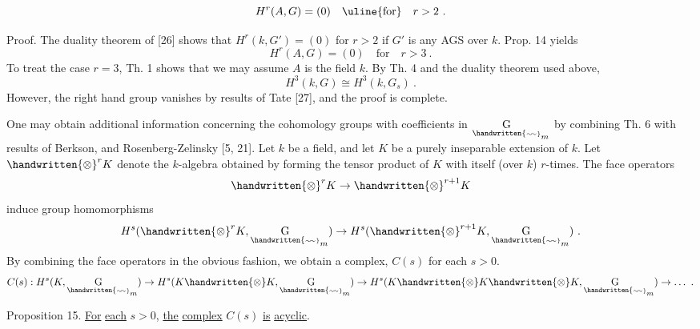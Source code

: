\[
H^r(A,G)=(0)\quad\text{\uline{for}}\quad r>2\ .
\]

Proof. The duality theorem of [26] shows that $H^r(k,G')=(0)$ for $r>2$ if $G'$ is any AGS over $k$. Prop. 14 yields
\[
H^r(A,G)=(0)\quad\text{for}\quad r>3\ .
\]
To treat the case $r=3$, Th. 1 shows that we may assume $A$ is the field $k$. By Th. 4 and the duality theorem used above,
\[
H^3(k,G)\cong H^3(k,G_s)\ .
\]
However, the right hand group vanishes by results of Tate [27], and the proof is complete.

One may obtain additional information concerning the cohomology groups with coefficients in $\underset{\handwritten{\scriptscriptstyle\sim\!\sim}}{\mathrm{G}}_m$ by combining Th. 6 with results of Berkson, and Rosenberg-Zelinsky [5, 21]. Let $k$ be a field, and let $K$ be a purely inseparable extension of $k$. Let $\handwritten{\otimes}^{r}K$ denote the $k$-algebra obtained by forming the tensor product of $K$ with itself (over $k$) $r$-times. The face operators
\[
\handwritten{\otimes}^{r}K\to\handwritten{\otimes}^{r+1}K
\]
induce group homomorphisms
\[
H^s(\handwritten{\otimes}^{r}K,\underset{\handwritten{\scriptscriptstyle\sim\!\sim}}{\mathrm G}_m)\to H^s(\handwritten{\otimes}^{r+1}K,\underset{\handwritten{\scriptscriptstyle\sim\!\sim}}{\mathrm G}_m)\ .
\]
By combining the face operators in the obvious fashion, we obtain a complex, $C(s)$ for each $s>0$.
\[
C(s):H^s(K,\underset{\handwritten{\scriptscriptstyle\sim\!\sim}}{\mathrm G}_m)\to H^s(K\handwritten{\otimes}K,\underset{\handwritten{\scriptscriptstyle\sim\!\sim}}{\mathrm G}_m)\to H^s(K\handwritten{\otimes}K\handwritten{\otimes}K,\underset{\handwritten{\scriptscriptstyle\sim\!\sim}}{\mathrm G}_m)\to\ldots\ .
\]

Proposition 15. \uline{For} \uline{each} $s>0$, \uline{the} \uline{complex} $C(s)$ \uline{is} \uline{acyclic}.
